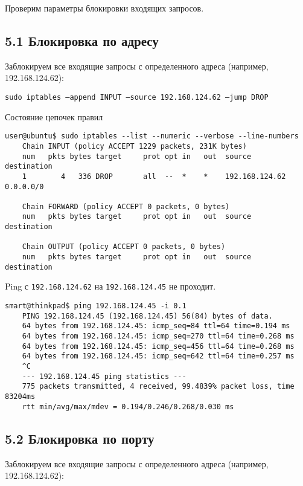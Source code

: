 Проверим параметры блокировки входящих запросов.

\subsection*{5.1 Блокировка по адресу}

Заблокируем все входящие запросы с определенного адреса (например, 192.168.124.62):

\texttt{sudo iptables --append INPUT --source 192.168.124.62 --jump DROP}

Состояние цепочек правил
\begin{Verbatim}[frame=single]
    user@ubuntu$ sudo iptables --list --numeric --verbose --line-numbers
    Chain INPUT (policy ACCEPT 1229 packets, 231K bytes)
    num   pkts bytes target     prot opt in   out  source           destination
    1        4   336 DROP       all  --  *    *    192.168.124.62   0.0.0.0/0
    
    Chain FORWARD (policy ACCEPT 0 packets, 0 bytes)
    num   pkts bytes target     prot opt in   out  source           destination
    
    Chain OUTPUT (policy ACCEPT 0 packets, 0 bytes)
    num   pkts bytes target     prot opt in   out  source           destination
\end{Verbatim}

Ping с \texttt{192.168.124.62} на \texttt{192.168.124.45} не проходит.
\begin{Verbatim}[frame=single]
    smart@thinkpad$ ping 192.168.124.45 -i 0.1
    PING 192.168.124.45 (192.168.124.45) 56(84) bytes of data.
    64 bytes from 192.168.124.45: icmp_seq=84 ttl=64 time=0.194 ms
    64 bytes from 192.168.124.45: icmp_seq=270 ttl=64 time=0.268 ms
    64 bytes from 192.168.124.45: icmp_seq=456 ttl=64 time=0.268 ms
    64 bytes from 192.168.124.45: icmp_seq=642 ttl=64 time=0.257 ms
    ^C
    --- 192.168.124.45 ping statistics ---
    775 packets transmitted, 4 received, 99.4839% packet loss, time 83204ms
    rtt min/avg/max/mdev = 0.194/0.246/0.268/0.030 ms
\end{Verbatim}

\subsection*{5.2 Блокировка по порту}

Заблокируем все входящие запросы с определенного адреса (например, 192.168.124.62):

